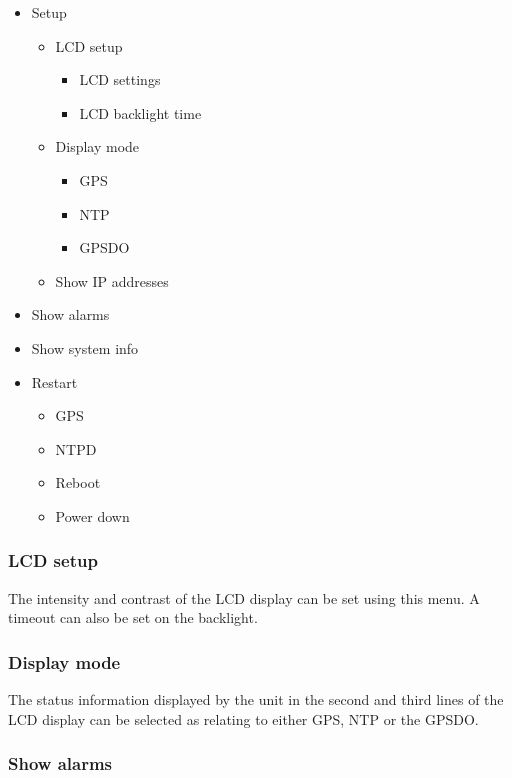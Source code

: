 \begin{itemize}
	\item Setup
		\begin{itemize}
			\item LCD setup
				\begin{itemize}
					\item LCD settings
					\item LCD backlight time
				\end{itemize}
			\item Display mode
				\begin{itemize}
					\item GPS
					\item NTP
					\item GPSDO
				\end{itemize}
			\item Show IP addresses
		\end{itemize}
		
	\item Show alarms
	\item Show system info
	\item Restart
		\begin{itemize}
			\item GPS
			\item NTPD
			\item Reboot
			\item Power down
		\end{itemize}
\end{itemize}

\subsubsection{LCD setup}

The intensity and contrast of the LCD display can be set using this menu.
A timeout can also be set on the backlight.

\subsubsection{Display mode}

The status information displayed by the unit in the second and third lines of the LCD display
can be selected as relating to either GPS, NTP or the GPSDO.

\subsubsection{Show alarms}

